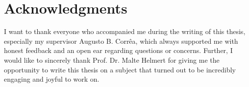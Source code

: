 \chapter{Acknowledgments}
I want to thank everyone who accompanied me during the writing of this thesis, especially my supervisor Augusto B. Corrêa, which always supported me with honest feedback and an open ear regarding questions or concerns. Further, I would like to sincerely thank Prof. Dr. Malte Helmert for giving me the opportunity to write this thesis on a subject that turned out to be incredibly engaging and joyful to work on.